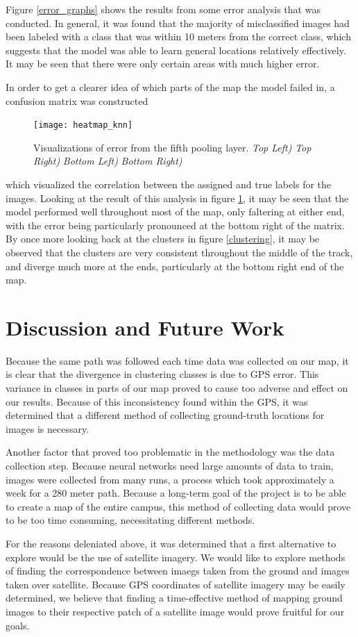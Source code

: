 \documentclass[letterpaper, 12 pt, conference]{ieeeconf}  %
\begin{document}
Figure \ref{error_graphs} shows the results from some error analysis that was conducted. In general, it was found that the majority of misclassified images had been labeled with a class that was within 10 meters from the correct class, which suggests that the model was able to learn general locations relatively effectively. It may be seen that there were only certain areas with much higher error. 
\par
In order to get a clearer idea of which parts of the map the model failed in, a confusion matrix was constructed
\begin{figure}[h]
\centering
\texttt{[image: heatmap\_knn]}
\caption{Visualizations of error from the fifth pooling layer. \textit{Top Left)} \textit{Top Right)} \textit{Bottom Left)} \textit{Bottom Right)}}
\label{confusion_matrix}
\end{figure}
which visualized the correlation between the assigned and true labels for the images. Looking at the result of this analysis in figure \ref{confusion_matrix}, it may be seen that the model performed well throughout most of the map, only faltering at either end, with the error being particularly pronounced at the bottom right of the matrix. By once more looking back at the clusters in figure \ref{clustering}, it may be observed that the clusters are very consistent throughout the middle of the track, and diverge much more at the ends, particularly at the bottom right end of the map. 

\section{Discussion and Future Work}

Because the same path was followed each time data was collected on our map, it is clear that the divergence in clustering classes is due to GPS error. This variance in classes in parts of our map proved to cause too adverse and effect on our results. Because of this inconsistency found within the GPS, it was determined that a different method of collecting ground-truth locations for images is necessary. 
\par
Another factor that proved too problematic in the methodology was the data collection step. Because neural networks need large amounts of data to train, images were collected from many runs, a process which took approximately a week for a 280 meter path. Because a long-term goal of the project is to be able to create a map of the entire campus, this method of collecting data would prove to be too time consuming, necessitating different methods. 
\par
For the reasons deleniated above, it was determined that a first alternative to explore would be the use of satellite imagery. We would like to explore methods of finding the correspondence between imaegs taken from the ground and images taken over satellite. Because GPS coordinates of satellite imagery may be easily determined, we believe that finding a time-effective method of mapping ground images to their respective patch of a satellite image would prove fruitful for our goals. 
\end{document}
